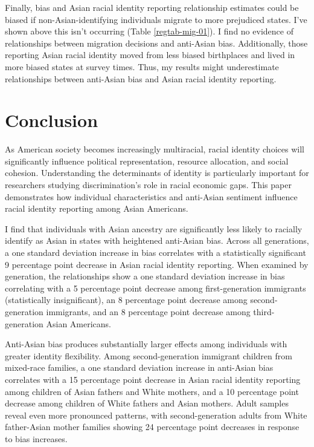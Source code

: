 Finally, bias and Asian racial identity reporting relationship estimates could be biased if non-Asian-identifying individuals migrate to more prejudiced states. I've shown above this isn't occurring (Table \ref{regtab-mig-01}). I find no evidence of relationships between migration decisions and anti-Asian bias. Additionally, those reporting Asian racial identity moved from less biased birthplaces and lived in more biased states at survey times. Thus, my results might underestimate relationships between anti-Asian bias and Asian racial identity reporting.

\section{Conclusion}\label{sec:conc}

As American society becomes increasingly multiracial, racial identity choices will significantly influence political representation, resource allocation, and social cohesion. Understanding the determinants of identity is particularly important for researchers studying discrimination's role in racial economic gaps. This paper demonstrates how individual characteristics and anti-Asian sentiment influence racial identity reporting among Asian Americans.

I find that individuals with Asian ancestry are significantly less likely to racially identify as Asian in states with heightened anti-Asian bias. Across all generations, a one standard deviation increase in bias correlates with a statistically significant 9 percentage point decrease in Asian racial identity reporting. When examined by generation, the relationships show a one standard deviation increase in bias correlating with a 5 percentage point decrease among first-generation immigrants (statistically insignificant), an 8 percentage point decrease among second-generation immigrants, and an 8 percentage point decrease among third-generation Asian Americans.

Anti-Asian bias produces substantially larger effects among individuals with greater identity flexibility. Among second-generation immigrant children from mixed-race families, a one standard deviation increase in anti-Asian bias correlates with a 15 percentage point decrease in Asian racial identity reporting among children of Asian fathers and White mothers, and a 10 percentage point decrease among children of White fathers and Asian mothers. Adult samples reveal even more pronounced patterns, with second-generation adults from White father-Asian mother families showing 24 percentage point decreases in response to bias increases.

